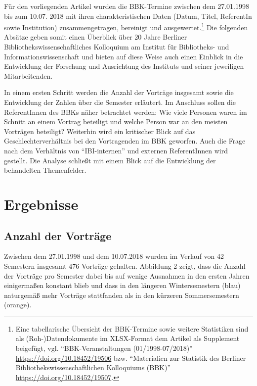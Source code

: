 \documentclass[a4paper,
fontsize=11pt,
oneside,
numbers=noperiodatend,
parskip=half-,
bibliography=totoc,
final
]{scrartcl}
\begin{document}
Für den vorliegenden Artikel wurden die BBK-Termine zwischen dem
27.01.1998 bis zum 10.07. 2018 mit ihren charakteristischen Daten (Datum,
Titel, ReferentIn sowie Institution) zusammengetragen, bereinigt und
ausgewertet.\footnote{Eine tabellarische Übersicht der BBK-Termine sowie
  weitere Statistiken sind als (Roh-)Datendokumente im XLSX-Format dem
  Artikel als Supplement beigefügt, vgl. \enquote{BBK-Veranstaltungen (01/1998-07/2018)} \href{https://doi.org/10.18452/19506}{https://doi.org/10.18452/19506} bzw. \enquote{Materialien zur Statistik des Berliner Bibliothekswissenschaftlichen Kolloquiums (BBK)} \href{https://doi.org/10.18452/19507}{https://doi.org/10.18452/19507}.} Die folgenden Absätze geben somit
einen Überblick über 20 Jahre Berliner Bibliothekswissenschaftliches
Kolloquium am Institut für Bibliotheks- und Informationswissenschaft und
bieten auf diese Weise auch einen Einblick in die Entwicklung der
Forschung und Ausrichtung des Instituts und seiner jeweiligen
Mitarbeitenden.

In einem ersten Schritt werden die Anzahl der Vorträge insgesamt sowie
die Entwicklung der Zahlen über die Semester erläutert. Im Anschluss
sollen die ReferentInnen des BBKs näher betrachtet werden: Wie viele
Personen waren im Schnitt an einem Vortrag beteiligt und welche Person
war an den meisten Vorträgen beteiligt? Weiterhin wird ein kritischer
Blick auf das Geschlechterverhältnis bei den Vortragenden im BBK
geworfen. Auch die Frage nach dem Verhältnis von \enquote{IBI-internen}
und externen ReferentInnen wird gestellt. Die Analyse schließt mit einem
Blick auf die Entwicklung der behandelten Themenfelder.

\hypertarget{ergebnisse}{%
\section{Ergebnisse}\label{ergebnisse}}

\hypertarget{anzahl-der-vortruxe4ge}{%
\subsection{Anzahl der Vorträge}\label{anzahl-der-vortruxe4ge}}

Zwischen dem 27.01.1998 und dem 10.07.2018 wurden im Verlauf von 42
Semestern insgesamt 476 Vorträge gehalten. Abbildung 2 zeigt, dass die
Anzahl der Vorträge pro Semester dabei bis auf wenige Ausnahmen in den
ersten Jahren einigermaßen konstant blieb und dass in den längeren
Wintersemestern (blau) naturgemäß mehr Vorträge stattfanden als in den
kürzeren Sommersemestern (orange).
\end{document}
